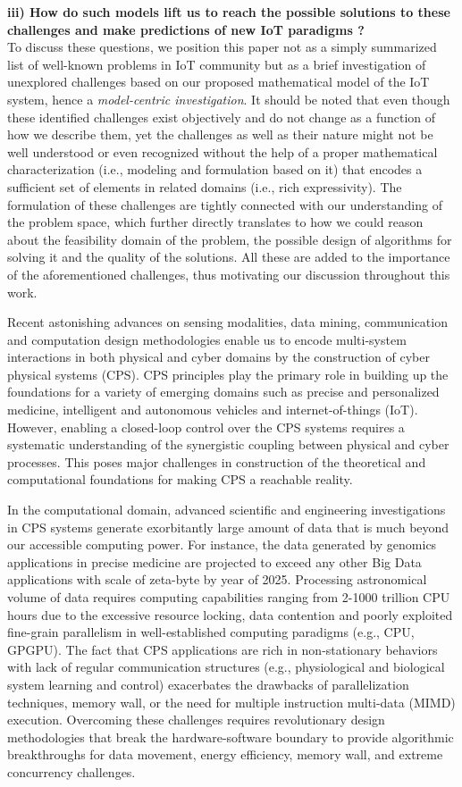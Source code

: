 \noindent\textbf{iii) How do such models lift us to reach the possible solutions to these challenges and make predictions of new IoT paradigms ?} \\
\indent To discuss these questions, we position this paper not as a simply summarized list of well-known problems in IoT community but as a brief investigation of unexplored challenges based on our proposed mathematical model of the IoT system, hence a \textit{model-centric investigation}. It should be noted that even though these identified challenges exist objectively and do not change as a function of how we describe them, yet the challenges as well as their nature might not be well understood or even recognized without the help of a proper mathematical characterization (i.e., modeling and formulation based on it) that encodes a sufficient set of elements in related domains (i.e., rich expressivity). The formulation of these challenges are tightly connected with our understanding of the problem space, which further directly translates to how we could reason about the feasibility domain of the problem, the possible design of algorithms for solving it and the quality of the solutions. All these are added to the importance of the aforementioned challenges, thus motivating our discussion throughout this work.

Recent astonishing advances on sensing modalities, data mining, communication and computation design methodologies enable us to encode multi-system interactions in both physical and cyber domains by the construction of cyber physical systems (CPS). CPS principles play the primary role in building up the foundations for a variety of emerging domains such as precise and personalized medicine, intelligent and autonomous vehicles and internet-of-things (IoT). However, enabling a closed-loop control over the CPS systems requires a systematic understanding of the synergistic coupling between physical and cyber processes. This poses major challenges in construction of the theoretical and computational foundations for making CPS a reachable reality.

In the computational domain, advanced scientific and engineering investigations in CPS systems generate exorbitantly large amount of data that is much beyond our accessible computing power. For instance, the data generated by genomics applications in precise medicine are projected to exceed any other Big Data applications with scale of zeta-byte by year of 2025. Processing astronomical volume of data requires computing capabilities ranging from 2-1000 trillion CPU hours due to the excessive resource locking, data contention and poorly exploited fine-grain parallelism in well-established computing paradigms (e.g., CPU, GPGPU). The fact that CPS applications are rich in non-stationary behaviors with lack of regular communication structures (e.g., physiological and biological system learning and control) exacerbates the drawbacks of parallelization techniques, memory wall, or the need for multiple instruction multi-data (MIMD) execution. Overcoming these challenges requires revolutionary design methodologies that break the hardware-software boundary to provide algorithmic breakthroughs for data movement, energy efficiency, memory wall, and extreme concurrency challenges. 

